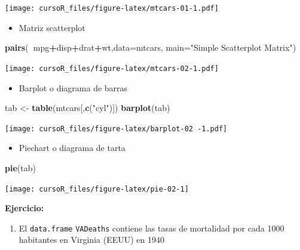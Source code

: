 \documentclass[]{book}
\newenvironment{Shaded}{\begin{snugshade}}{\end{snugshade}}
\newcommand{\KeywordTok}[1]{\textcolor[rgb]{0.13,0.29,0.53}{\textbf{#1}}}
\newcommand{\DataTypeTok}[1]{\textcolor[rgb]{0.13,0.29,0.53}{#1}}
\newcommand{\StringTok}[1]{\textcolor[rgb]{0.31,0.60,0.02}{#1}}
\newcommand{\OperatorTok}[1]{\textcolor[rgb]{0.81,0.36,0.00}{\textbf{#1}}}
\newcommand{\NormalTok}[1]{#1}
\providecommand{\tightlist}{%
  \setlength{\itemsep}{0pt}\setlength{\parskip}{0pt}}
\begin{document}
\texttt{[image: cursoR\_files/figure-latex/mtcars-01-1.pdf]}

\begin{itemize}
\tightlist
\item
  Matriz scatterplot
\end{itemize}

\begin{Shaded}
\begin{Highlighting}[]
\KeywordTok{pairs}\NormalTok{(}\OperatorTok{~}\NormalTok{mpg}\OperatorTok{+}\NormalTok{disp}\OperatorTok{+}\NormalTok{drat}\OperatorTok{+}\NormalTok{wt,}\DataTypeTok{data=}\NormalTok{mtcars,}
   \DataTypeTok{main=}\StringTok{"Simple Scatterplot Matrix"}\NormalTok{)}
\end{Highlighting}
\end{Shaded}

\texttt{[image: cursoR\_files/figure-latex/mtcars-02-1.pdf]}

\begin{itemize}
\tightlist
\item
  Barplot o diagrama de barras
\end{itemize}

\begin{Shaded}
\begin{Highlighting}[]
\NormalTok{tab <-}\StringTok{ }\KeywordTok{table}\NormalTok{(mtcars[,}\KeywordTok{c}\NormalTok{(}\StringTok{"cyl"}\NormalTok{)])}
\KeywordTok{barplot}\NormalTok{(tab)}
\end{Highlighting}
\end{Shaded}

\texttt{[image: cursoR\_files/figure-latex/barplot-02 -1.pdf]}

\begin{itemize}
\tightlist
\item
  Piechart o diagrama de tarta
\end{itemize}

\begin{Shaded}
\begin{Highlighting}[]
\KeywordTok{pie}\NormalTok{(tab)}
\end{Highlighting}
\end{Shaded}

\begin{center}\texttt{[image: cursoR\_files/figure-latex/pie-02-1]} \end{center}

\textbf{Ejercicio:}

\begin{enumerate}
\def\labelenumi{\arabic{enumi}.}
\tightlist
\item
  El \texttt{data.frame} \texttt{VADeaths} contiene las tasas de
  mortalidad por cada 1000 habitantes en Virginia (EEUU) en 1940
\end{enumerate}
\end{document}
